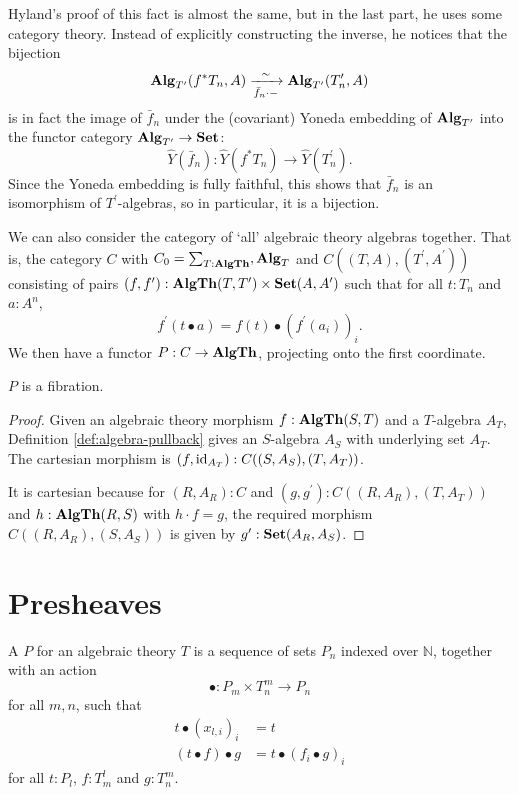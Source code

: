 \begin{remark}
  Hyland's proof of this fact is almost the same, but in the last part, he uses some category theory. Instead of explicitly constructing the inverse, he notices that the bijection
  \[ \mathbf{Alg}_{T^\prime}(f^* T_n, A) \xrightarrow[\bar f_n \cdot -] \sim \mathbf{Alg}_{T^\prime}(T^\prime_n, A) \]
  is in fact the image of $ \bar f_n $ under the (covariant) Yoneda embedding of $ \mathbf{Alg}_{T^\prime} $ into the functor category $ \mathbf{Alg}_{T^\prime} \to \mathbf{Set} $:
  \[ \hat Y(\bar f_n): \hat Y(f^* T_n) \to \hat Y(T^\prime_n). \]
  Since the Yoneda embedding is fully faithful, this shows that $ \bar f_n $ is an isomorphism of $ T^\prime $-algebras, so in particular, it is a bijection.
\end{remark}

We can also consider the category of `all' algebraic theory algebras together. That is, the category $ C $ with $ C_0 = \sum_{T : \mathbf{AlgTh}}, \mathbf{Alg}_{T} $ and $ C((T, A), (T^\prime, A^\prime)) $ consisting of pairs $ (f, f^\prime): \mathbf{AlgTh}(T, T^\prime) \times \mathbf{Set}(A, A^\prime) $ such that for all $ t: T_n $ and $ a: A^n $,
\[ f^\prime(t \bullet a) = f(t) \bullet (f^\prime(a_i))_i. \]
We then have a functor $ P: C \to \mathbf{AlgTh} $, projecting onto the first coordinate.

\begin{lemma}\label{lem:algebra-fibration}
  $ P $ is a fibration.
\end{lemma}
\begin{proof}
  Given an algebraic theory morphism $ f: \mathbf{AlgTh}(S, T) $ and a $ T $-algebra $ A_T $, Definition \ref{def:algebra-pullback} gives an $ S $-algebra $ A_S $ with underlying set $ A_T $. The cartesian morphism is $ (f, \text{id}_{A_T}): C((S, A_S), (T, A_T)) $.

  It is cartesian because for $ (R, A_R): C $ and $ (g, g^\prime): C((R, A_R), (T, A_T)) $ and $ h: \mathbf{AlgTh}(R, S) $ with $ h \cdot f = g $, the required morphism $ C((R, A_R), (S, A_S)) $ is given by $ g^\prime: \mathbf{Set}(A_R, A_S) $.
\end{proof}

\section{Presheaves}

\begin{definition}
  A  $ P $ for an algebraic theory $ T $ is a sequence of sets $ P_n $ indexed over $ \mathbb N $, together with an action
  \[ \bullet: P_m \times T_n^m \to P_n \]
  for all $ m, n $, such that
  \begin{align*}
    t \bullet (x_{l, i})_i &= t\\
    (t \bullet f) \bullet g &= t \bullet (f_i \bullet g)_i
  \end{align*}
  for all $ t: P_l $, $ f: T_m^l $ and $ g: T_n^m $.
\end{definition}

